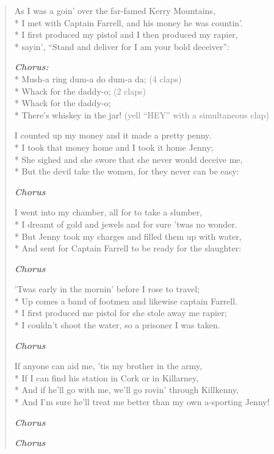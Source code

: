 \documentclass[9pt,twoside]{extarticle}
\newenvironment{xverse}{
	\begin{verse}
	\fontsize{8.5}{10.5}\selectfont
	}
	{
	\end{verse}
	\penalty 0
}
\newcommand{\chorusdef}{\textbf{\emph{Chorus:}}\\*}
\newcommand{\chorusmark}[1][1]{%
\vspace{-0.5\stanzaskip}%
\textbf{\emph{Chorus \ifthenelse{\equal{#1}{1}}{}{$\times$ #1}}}%
\vspace{-0.5\stanzaskip}%
}
\newcommand{\gray}[1]{\textcolor{gray}{#1}}
\begin{document}
\begin{xverse}
As I was a goin’ over the far-famed Kerry Mountains, \\*
I met with Captain Farrell, and his money he was countin’. \\*
I first produced my pistol and I then produced my rapier, \\*
sayin’, “Stand and deliver for I am your bold deceiver”:

\chorusdef
Mush-a ring dum-a do dum-a da; \gray{(4 claps)} \\*
Whack for the daddy-o; \gray{(2 claps)} \\*
Whack for the daddy-o; \\*
There’s whiskey in the jar! \gray{(yell “HEY” with a simultaneous clap)}

I counted up my money and it made a pretty penny. \\*
I took that money home and I took it home Jenny; \\*
She sighed and she swore that she never would deceive me, \\*
But the devil take the women, for they never can be easy:

\chorusmark

I went into my chamber, all for to take a slumber, \\*
I dreamt of gold and jewels and for sure ’twas no wonder. \\*
But Jenny took my charges and filled them up with water, \\*
And sent for Captain Farrell to be ready for the slaughter:

\chorusmark

’Twas early in the mornin’ before I rose to travel; \\*
Up comes a band of footmen and likewise captain Farrell. \\*
I first produced me pistol for she stole away me rapier; \\*
I couldn’t shoot the water, so a prisoner I was taken.

\chorusmark

If anyone can aid me, ’tis my brother in the army, \\*
If I can find his station in Cork or in Killarney, \\*
And if he’ll go with me, we’ll go rovin’ through Killkenny, \\*
And I’m sure he’ll treat me better than my own a-sporting Jenny!

\chorusmark

\chorusmark
\end{xverse}
\end{document}
